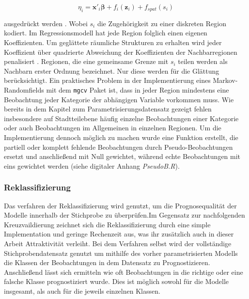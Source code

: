 \documentclass{Vorlage}
\begin{document}
\begin{equation}
\eta_{i} =\mathbf{x}'_i \boldsymbol{\beta}+f_{i}(\mathbf{z}_{i})+f_{spat}(s_i)
\end{equation}


ausgedrückt werden \cite[p. 541]{fahrmeir2013regression}. Wobei $s_i$ die Zugehörigkeit zu einer diskreten Region kodiert. Im Regressionsmodell hat jede Region folglich einen eigenen Koeffizienten. Um geglättete räumliche Strukturen zu erhalten wird jeder Koeffizient über quadrierte Abweichung der Koeffizienten der Nachbarregionen penalisiert \cite[p. 522]{fahrmeir2013regression}. Regionen, die eine gemeinsame Grenze mit $s_i$ teilen werden als Nachbarn erster Ordnung bezeichnet. Nur diese werden für die Glättung berücksichtigt.
Ein praktisches Problem in der Implementierung eines Markov-Randomfields mit dem \texttt{mgcv} Paket ist, dass in jeder Region mindestens eine Beobachtung jeder Kategorie der abhängigen Variable vorkommen muss. Wie bereits in dem Kapitel zum Parametrisierungsdatensatz gezeigt fehlen insbesondere auf Stadtteilebene häufig einzelne Beobachtungen einer Kategorie oder auch Beobachtungen im Allgemeinen in einzelnen Regionen. Um die Implementierung dennoch möglich zu machen wurde eine Funktion erstellt, die partiell oder komplett fehlende Beobachtungen durch Pseudo-Beobachtungen ersetzt und anschließend mit Null gewichtet, während echte Beobachtungen mit eins gewichtet werden (siehe digitaler Anhang \textit{PseudoB.R}).

\subsubsection{Reklassifizierung}

Das verfahren der Reklassifizierung wird genutzt, um die Prognosequalität der Modelle innerhalb der Stichprobe zu überprüfen.Im Gegensatz zur nachfolgenden Kreuzvaildierung zeichnet sich die Reklassifizierung durch eine simple Implementation und geringe Rechenzeit aus, was ihr zusätzlich auch in dieser Arbeit Attraktivität verleiht. Bei dem Verfahren selbst wird der vollständige Stichprobendatensatz genutzt um mithilfe des vorher parametrisierten Modells die Klassen der Beobachtungen in dem Datensatz zu Prognostizieren. Anschließend lässt sich ermitteln wie oft Beobachtungen in die richtige oder eine falsche Klasse prognostiziert wurde. Dies ist möglich sowohl für die Modelle insgesamt, als auch für die jeweils einzelnen Klassen.
\end{document}
